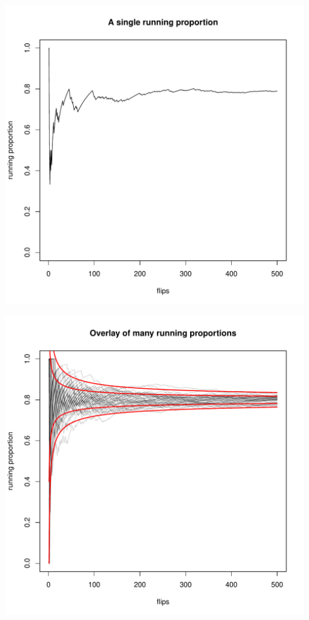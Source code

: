 \begin{frame}
\includegraphics[scale=0.5]{4-2_conf_int/figures/run/running_proportion.pdf}
\end{frame}

\begin{frame}
\includegraphics[scale=0.5]{4-2_conf_int/figures/run/running_proportion_overlay.pdf}
\end{frame}



